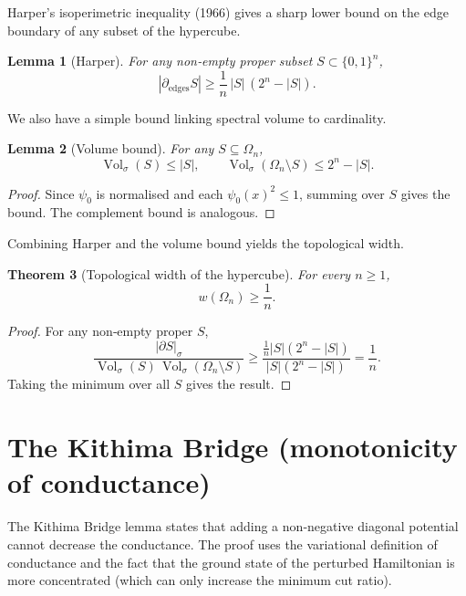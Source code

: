 \documentclass[11pt,a4paper]{article}
\newtheorem{theorem}{Theorem}[section]
\newtheorem{lemma}[theorem]{Lemma}
\begin{document}
Harper's isoperimetric inequality (1966) gives a sharp lower bound on the edge boundary of any subset of the hypercube.

\begin{lemma}[Harper]\label{lem:harper}
For any non‑empty proper subset \(S\subset\{0,1\}^n\),
\[
|\partial_{\mathrm{edges}} S| \ge \frac{1}{n}\,|S|\,(2^n-|S|).
\]
\end{lemma}

We also have a simple bound linking spectral volume to cardinality.

\begin{lemma}[Volume bound]\label{lem:vol}
For any \(S\subseteq\Omega_n\),
\[
\operatorname{Vol}_\sigma(S) \le |S|,\qquad
\operatorname{Vol}_\sigma(\Omega_n\setminus S) \le 2^n - |S|.
\]
\end{lemma}
\begin{proof}
Since \(\psi_0\) is normalised and each \(\psi_0(x)^2 \le 1\), summing over \(S\) gives the bound. The complement bound is analogous.
\end{proof}

Combining Harper and the volume bound yields the topological width.

\begin{theorem}[Topological width of the hypercube]\label{thm:width}
For every \(n\ge 1\),
\[
w(\Omega_n) \ge \frac{1}{n}.
\]
\end{theorem}
\begin{proof}
For any non‑empty proper \(S\),
\[
\frac{|\partial S|_\sigma}{\operatorname{Vol}_\sigma(S)\,\operatorname{Vol}_\sigma(\Omega_n\setminus S)}
\ge \frac{\frac{1}{n}|S|(2^n-|S|)}{|S|(2^n-|S|)} = \frac{1}{n}.
\]
Taking the minimum over all \(S\) gives the result.
\end{proof}

\section{The Kithima Bridge (monotonicity of conductance)}

The Kithima Bridge lemma states that adding a non‑negative diagonal potential cannot decrease the conductance. The proof uses the variational definition of conductance and the fact that the ground state of the perturbed Hamiltonian is more concentrated (which can only increase the minimum cut ratio).
\end{document}
